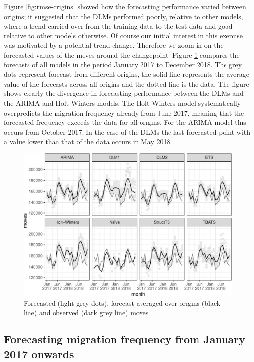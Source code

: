 \documentclass[]{article}
\begin{document}
Figure \ref{fig:rmse-origins} showed how the forecasting performance
varied between origins; it suggested that the DLMs performed poorly,
relative to other models, where a trend carried over from the training
data to the test data and good relative to other models otherwise. Of
course our initial interest in this exercise was motivated by a
potential trend change. Therefore we zoom in on the forecasted values of
the moves around the changepoint. Figure \ref{fig:forecast-2017-2018}
compares the forecasts of all models in the period January 2017 to
December 2018. The grey dots represent forecast from different origins,
the solid line represents the average value of the forecasts across all
origins and the dotted line is the data. The figure shows clearly the
divergence in forecasting performance between the DLMs and the ARIMA and
Holt-Winters models. The Holt-Winters model systematically overpredicts
the migration frequency already from June 2017, meaning that the
forecasted frequency exceeds the data for all origins. For the ARIMA
model this occurs from October 2017. In the case of the DLMs the last
forecasted point with a value lower than that of the data occurs in May
2018.

\begin{figure}
\centering
\includegraphics{../figs/freq--forecast-2017-2018-1.pdf}
\caption{\label{fig:forecast-2017-2018}Forecasted (light grey dots),
forecast averaged over origins (black line) and observed (dark grey
line) moves}
\end{figure}

\subsection{Forecasting migration frequency from January 2017
onwards}\label{forecasting-migration-frequency-from-january-2017-onwards}
\end{document}
